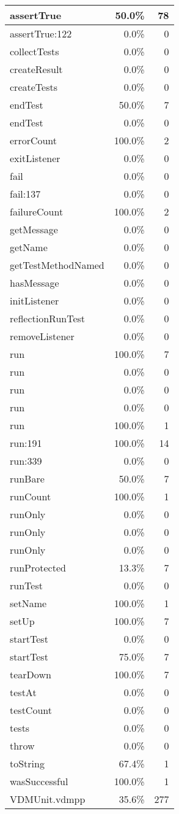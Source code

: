 \documentclass[a4paper]{article}
\begin{document}
\begin{longtable}{|l|r|r|}
\hline
assertTrue & 50.0\% & 78 \\
\hline
assertTrue:122 & 0.0\% & 0 \\
\hline
collectTests & 0.0\% & 0 \\
\hline
createResult & 0.0\% & 0 \\
\hline
createTests & 0.0\% & 0 \\
\hline
endTest & 50.0\% & 7 \\
\hline
endTest & 0.0\% & 0 \\
\hline
errorCount & 100.0\% & 2 \\
\hline
exitListener & 0.0\% & 0 \\
\hline
fail & 0.0\% & 0 \\
\hline
fail:137 & 0.0\% & 0 \\
\hline
failureCount & 100.0\% & 2 \\
\hline
getMessage & 0.0\% & 0 \\
\hline
getName & 0.0\% & 0 \\
\hline
getTestMethodNamed & 0.0\% & 0 \\
\hline
hasMessage & 0.0\% & 0 \\
\hline
initListener & 0.0\% & 0 \\
\hline
reflectionRunTest & 0.0\% & 0 \\
\hline
removeListener & 0.0\% & 0 \\
\hline
run & 100.0\% & 7 \\
\hline
run & 0.0\% & 0 \\
\hline
run & 0.0\% & 0 \\
\hline
run & 0.0\% & 0 \\
\hline
run & 100.0\% & 1 \\
\hline
run:191 & 100.0\% & 14 \\
\hline
run:339 & 0.0\% & 0 \\
\hline
runBare & 50.0\% & 7 \\
\hline
runCount & 100.0\% & 1 \\
\hline
runOnly & 0.0\% & 0 \\
\hline
runOnly & 0.0\% & 0 \\
\hline
runOnly & 0.0\% & 0 \\
\hline
runProtected & 13.3\% & 7 \\
\hline
runTest & 0.0\% & 0 \\
\hline
setName & 100.0\% & 1 \\
\hline
setUp & 100.0\% & 7 \\
\hline
startTest & 0.0\% & 0 \\
\hline
startTest & 75.0\% & 7 \\
\hline
tearDown & 100.0\% & 7 \\
\hline
testAt & 0.0\% & 0 \\
\hline
testCount & 0.0\% & 0 \\
\hline
tests & 0.0\% & 0 \\
\hline
throw & 0.0\% & 0 \\
\hline
toString & 67.4\% & 1 \\
\hline
wasSuccessful & 100.0\% & 1 \\
\hline
\hline
VDMUnit.vdmpp & 35.6\% & 277 \\
\hline
\end{longtable}
\end{document}
